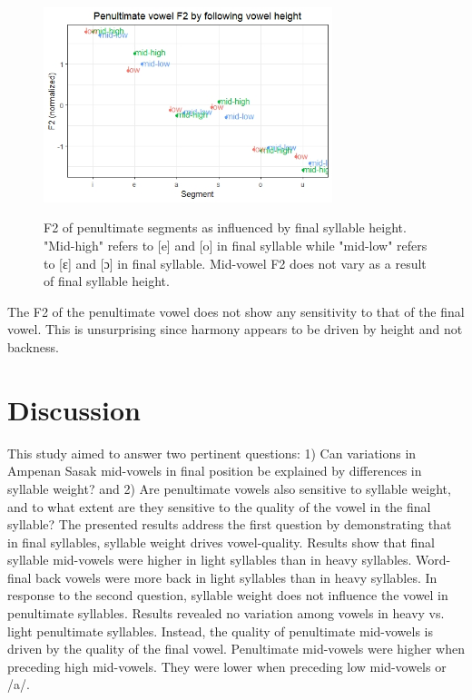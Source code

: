 \documentclass[12pt]{ouparticle}
\begin{document}
\begin{figure}[h!]
\centering
    \caption{F2 of penultimate segments as influenced by final syllable height. "Mid-high" refers to [e] and [o] in final syllable while "mid-low" refers to [ɛ] and [ɔ] in final syllable. Mid-vowel F2 does not vary as a result of final syllable height.}
    \includegraphics[width=0.75\textwidth]{Figure10.jpg}
    \label{fig:Syll2f2_Segfh}
\end{figure}

The F2 of the penultimate vowel does not show any sensitivity to that of the final vowel. This is unsurprising since harmony appears to be driven by height and not backness.

\newpage

\section{Discussion}\label{sec:discussion}

This study aimed to answer two pertinent questions: 1) Can variations in Ampenan Sasak mid-vowels in final position be explained by differences in syllable weight? and 2) Are penultimate vowels also sensitive to syllable weight, and to what extent are they sensitive to the quality of the vowel in the final syllable? The presented results address the first question by demonstrating that in final syllables, syllable weight drives vowel-quality. Results show that final syllable mid-vowels were higher in light syllables than in heavy syllables. Word-final back vowels were more back in light syllables than in heavy syllables. In response to the second question, syllable weight does not influence the vowel in penultimate syllables. Results revealed no variation among vowels in heavy vs. light penultimate syllables. Instead, the quality of penultimate mid-vowels is driven by the quality of the final vowel. Penultimate mid-vowels were higher when preceding high mid-vowels. They were lower when preceding low mid-vowels or /a/. 
\end{document}
